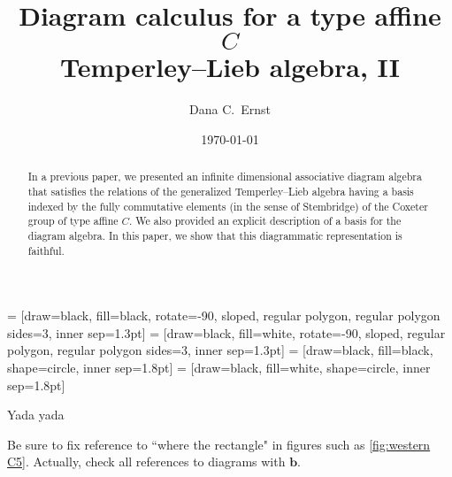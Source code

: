 \documentclass[11pt]{amsart}
\date{\today}
\theoremstyle{definition}
\numberwithin{equation}{section}
\renewcommand{\(}{\left(}
\renewcommand{\)}{\right)}
\begin{document}
 = [draw=black, fill=black, rotate=-90, sloped, regular polygon, regular polygon sides=3, inner sep=1.3pt]
 = [draw=black, fill=white, rotate=-90, sloped, regular polygon, regular polygon sides=3, inner sep=1.3pt]
 = [draw=black, fill=black, shape=circle, inner sep=1.8pt]
 = [draw=black, fill=white, shape=circle, inner sep=1.8pt]

\title[Diagram calculus for a type affine $C$ Temperley--Lieb algebra, II]{Diagram calculus for a type affine $C$ \\ Temperley--Lieb algebra, II}

\author[D.C.~Ernst]{Dana C.~Ernst}
\address{Department of Mathematics and Statistics, Northern Arizona University, Flagstaff, AZ 86011}



\begin{abstract}
In a previous paper, we presented an infinite dimensional associative diagram algebra that satisfies the relations of the generalized Temperley--Lieb algebra having a basis indexed by the fully commutative elements (in the sense of Stembridge) of the Coxeter group of type affine $C$.  We also provided an explicit description of a basis for the diagram algebra.  In this paper, we show that this diagrammatic representation is faithful.
\end{abstract}

\maketitle

Yada yada

{\color{red}Be sure to fix reference to ``where the rectangle" in figures such as \ref{fig:western C5}. Actually, check all references to diagrams with $\mathbf{b}$.}

\end{document}

